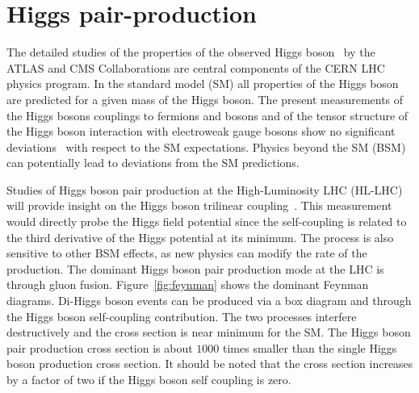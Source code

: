 

\providecommand{\phasezero}{Phase-0}
\providecommand{\phaseone}{Phase-I}
\providecommand{\phasetwo}{Phase-II}

\chapter{Higgs pair-production}

The detailed studies of the properties of the observed Higgs
boson~\cite{AtlasPaperCombination, CMSPaperCombination,
  CMSPaperCombination2} by the ATLAS and CMS Collaborations are central components of the CERN LHC physics program. In the standard model (SM) all properties of the Higgs boson are predicted for a given mass of the Higgs boson. The present measurements of the Higgs bosons couplings to fermions and bosons and of the tensor structure of the Higgs boson interaction with electroweak gauge bosons show no
significant deviations~\cite{Khachatryan:2014jba,PhysRevD.92.012004} with respect to the SM expectations. Physics beyond the SM (BSM) can potentially lead to deviations from the SM predictions. 

Studies of Higgs boson pair production at the High-Luminosity LHC (HL-LHC) will provide
insight on the  Higgs boson trilinear coupling~\cite{Glover:1987nx,Plehn:1996wb,Djouadi:1999rca,Gianotti:2002xx,Baur:2003gpa,Baur:2003gp,Baglio:2012np}. 
This measurement would directly probe the Higgs field potential since the self-coupling is related to the third derivative of the Higgs potential at its minimum. The process is also
sensitive to other BSM effects, as new physics can modify the rate of the production. The dominant Higgs boson pair production mode at the LHC is through gluon fusion. Figure~\ref{fig:feynman} shows the 
dominant Feynman diagrams. Di-Higgs boson events can be produced via a box
diagram and through the Higgs boson self-coupling contribution. The two
processes interfere destructively and the cross section is near
minimum for the SM. The Higgs boson pair production cross  section
is about $1000$ times smaller than the single Higgs boson production cross
section. It should be noted that the cross section increases
by a factor of two if the Higgs boson self coupling is zero.  

